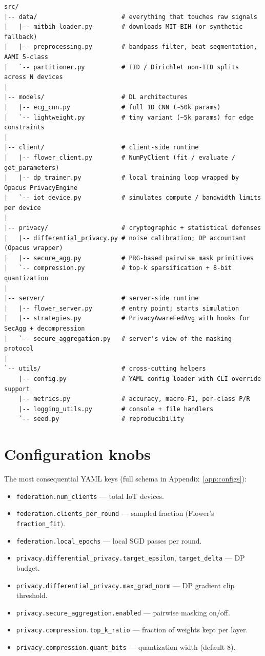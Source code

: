 \documentclass[11pt,a4paper]{report}
\begin{document}
\begin{verbatim}
src/
|-- data/                       # everything that touches raw signals
|   |-- mitbih_loader.py        # downloads MIT-BIH (or synthetic fallback)
|   |-- preprocessing.py        # bandpass filter, beat segmentation, AAMI 5-class
|   `-- partitioner.py          # IID / Dirichlet non-IID splits across N devices
|
|-- models/                     # DL architectures
|   |-- ecg_cnn.py              # full 1D CNN (~50k params)
|   `-- lightweight.py          # tiny variant (~5k params) for edge constraints
|
|-- client/                     # client-side runtime
|   |-- flower_client.py        # NumPyClient (fit / evaluate / get_parameters)
|   |-- dp_trainer.py           # local training loop wrapped by Opacus PrivacyEngine
|   `-- iot_device.py           # simulates compute / bandwidth limits per device
|
|-- privacy/                    # cryptographic + statistical defenses
|   |-- differential_privacy.py # noise calibration; DP accountant (Opacus wrapper)
|   |-- secure_agg.py           # PRG-based pairwise mask primitives
|   `-- compression.py          # top-k sparsification + 8-bit quantization
|
|-- server/                     # server-side runtime
|   |-- flower_server.py        # entry point; starts simulation
|   |-- strategies.py           # PrivacyAwareFedAvg with hooks for SecAgg + decompression
|   `-- secure_aggregation.py   # server's view of the masking protocol
|
`-- utils/                      # cross-cutting helpers
    |-- config.py               # YAML config loader with CLI override support
    |-- metrics.py              # accuracy, macro-F1, per-class P/R
    |-- logging_utils.py        # console + file handlers
    `-- seed.py                 # reproducibility
\end{verbatim}

\section{Configuration knobs}

The most consequential YAML keys (full schema in Appendix~\ref{app:configs}):

\begin{itemize}[leftmargin=*]
  \item \texttt{federation.num\_clients} --- total IoT devices.
  \item \texttt{federation.clients\_per\_round} --- sampled fraction (Flower's \texttt{fraction\_fit}).
  \item \texttt{federation.local\_epochs} --- local SGD passes per round.
  \item \texttt{privacy.differential\_privacy.target\_epsilon}, \texttt{target\_delta} --- DP budget.
  \item \texttt{privacy.differential\_privacy.max\_grad\_norm} --- DP gradient clip threshold.
  \item \texttt{privacy.secure\_aggregation.enabled} --- pairwise masking on/off.
  \item \texttt{privacy.compression.top\_k\_ratio} --- fraction of weights kept per layer.
  \item \texttt{privacy.compression.quant\_bits} --- quantization width (default 8).
\end{itemize}
\end{document}
